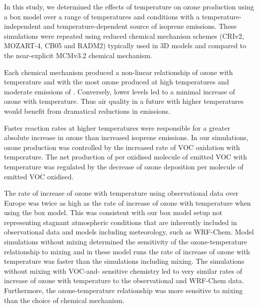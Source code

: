 In this study, we determined the effects of temperature on ozone production using a box model over a range of temperatures and  conditions with a temperature-independent and temperature-dependent source of isoprene emissions.
These simulations were repeated using reduced chemical mechanism schemes (CRIv2, MOZART-4, CB05 and RADM2) typically used in 3D models and compared to the near-explicit MCMv3.2 chemical mechanism.

Each chemical mechanism produced a non-linear relationship of ozone with temperature and  with the most ozone produced at high temperatures and moderate emissions of .
Conversely, lower  levels led to a minimal increase of ozone with temperature.
Thus air quality in a future with higher temperatures would benefit from dramatical reductions in  emissions.

Faster reaction rates at higher temperatures were responsible for a greater absolute increase in ozone than increased isoprene emissions.
In our simulations, ozone production was controlled by the increased rate of VOC oxidation with temperature.
The net production of  per oxidised molecule of emitted VOC with temperature was regulated by the decrease of ozone deposition per molecule of emitted VOC oxidised.

The rate of increase of ozone with temperature using observational data over Europe was twice as high as the rate of increase of ozone with temperature when using the box model.
This was consistent with our box model setup not representing stagnant atmospheric conditions that are inherently included in observational data and models including meteorology, such as WRF-Chem.
Model simulations without mixing determined the sensitivity of the ozone-temperature relationship to mixing and in these model runs the rate of increase of ozone with temperature was faster than the simulations including mixing.
The simulations without mixing with VOC-and- sensitive chemistry led to very similar rates of increase of ozone with temperature to the observational and WRF-Chem data.
Furthermore, the ozone-temperature relationship was more sensitive to mixing than the choice of chemical mechanism.
